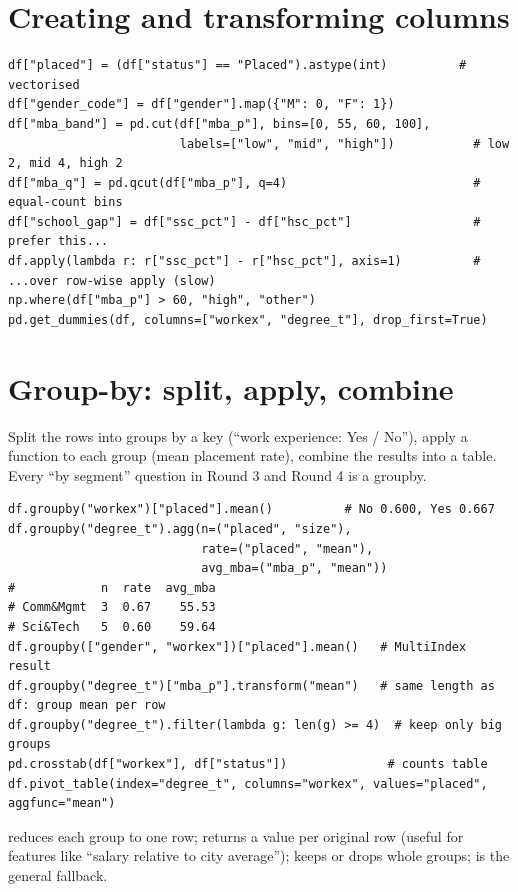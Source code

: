 \section{Creating and transforming columns}
\begin{lstlisting}
df["placed"] = (df["status"] == "Placed").astype(int)          # vectorised
df["gender_code"] = df["gender"].map({"M": 0, "F": 1})
df["mba_band"] = pd.cut(df["mba_p"], bins=[0, 55, 60, 100],
                        labels=["low", "mid", "high"])           # low 2, mid 4, high 2
df["mba_q"] = pd.qcut(df["mba_p"], q=4)                          # equal-count bins
df["school_gap"] = df["ssc_pct"] - df["hsc_pct"]                 # prefer this...
df.apply(lambda r: r["ssc_pct"] - r["hsc_pct"], axis=1)          # ...over row-wise apply (slow)
np.where(df["mba_p"] > 60, "high", "other")
pd.get_dummies(df, columns=["workex", "degree_t"], drop_first=True)
\end{lstlisting}

\section{Group-by: split, apply, combine}
\begin{intuition}
Split the rows into groups by a key (``work experience: Yes / No''), apply a function to each group (mean placement rate), combine the results into a table. Every
``by segment'' question in Round 3 and Round 4 is a groupby.
\end{intuition}
\begin{lstlisting}
df.groupby("workex")["placed"].mean()          # No 0.600, Yes 0.667
df.groupby("degree_t").agg(n=("placed", "size"),
                           rate=("placed", "mean"),
                           avg_mba=("mba_p", "mean"))
#            n  rate  avg_mba
# Comm&Mgmt  3  0.67    55.53
# Sci&Tech   5  0.60    59.64
df.groupby(["gender", "workex"])["placed"].mean()   # MultiIndex result
df.groupby("degree_t")["mba_p"].transform("mean")   # same length as df: group mean per row
df.groupby("degree_t").filter(lambda g: len(g) >= 4)  # keep only big groups
pd.crosstab(df["workex"], df["status"])              # counts table
df.pivot_table(index="degree_t", columns="workex", values="placed", aggfunc="mean")
\end{lstlisting}
 reduces each group to one row;  returns a value per original row (useful for features like ``salary relative to city average'');
 keeps or drops whole groups;  is the general fallback.

